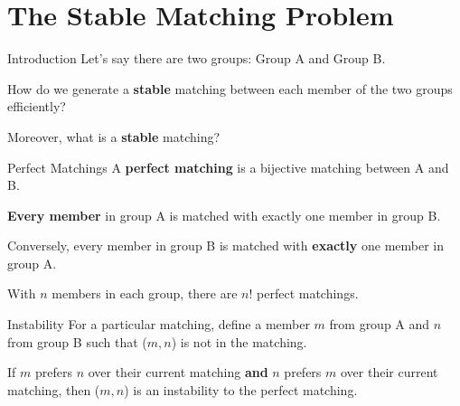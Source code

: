\documentclass{beamer}
\begin{document}
    \section{The Stable Matching Problem}
    \begin{frame}{Introduction}
        Let's say there are two groups: Group A and Group B.
        \bigskip

        How do we generate a \textbf{stable} matching between each member of the two groups efficiently?
        \bigskip

        Moreover, what is a \textbf{stable} matching?
    \end{frame}
    \begin{frame}{Perfect Matchings}
        A \textbf{perfect matching} is a bijective matching between A and B.
        \bigskip

        \textbf{Every member} in group A is matched with exactly one member in group B.
        \bigskip

        Conversely, every member in group B is matched with \textbf{exactly} one member in group A.
        \bigskip

        With $n$ members in each group, there are $n!$ perfect matchings.
    \end{frame}
    \begin{frame}{Instability}
        For a particular matching, define a member $m$ from group A and $n$ from group B such that ($m,n$) is not in the matching.
        \bigskip

        If $m$ prefers $n$ over their current matching \textbf{and} $n$ prefers $m$ over their current matching, then ($m,n$) is an instability to the perfect matching.
    \end{frame}
\end{document}
